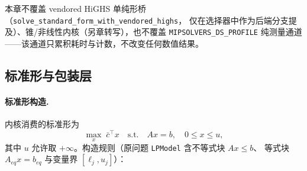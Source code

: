 \begin{boundarynote}
本章不覆盖 vendored HiGHS 单纯形桥（\texttt{solve\_standard\_form\_with\_vendored\_highs}，
仅在选择器中作为后端分支提及）、锥/非线性内核（另章转写），也不覆盖
\texttt{MIPSOLVERS\_DS\_PROFILE} 纯测量通道——该通道只累积耗时与计数，不改变任何数值结果。
\end{boundarynote}

\subsection{标准形与包装层}
\label{subsec:engine-lp-stdform}

\paragraph{标准形构造.}
内核消费的标准形为
\begin{equation}
  \max_{x}\; \bar{c}^{\top} x \quad \text{s.t.}\quad A x = b,\quad
  0 \le x \le u,
  \label{eq:lpkernel:stdform}
\end{equation}
其中 $u$ 允许取 $+\infty$。构造规则（原问题 \texttt{LPModel} 含不等式块 $A x \le b$、
等式块 $A_{eq} x = b_{eq}$ 与变量界 $[\ell_j, u_j]$）：


